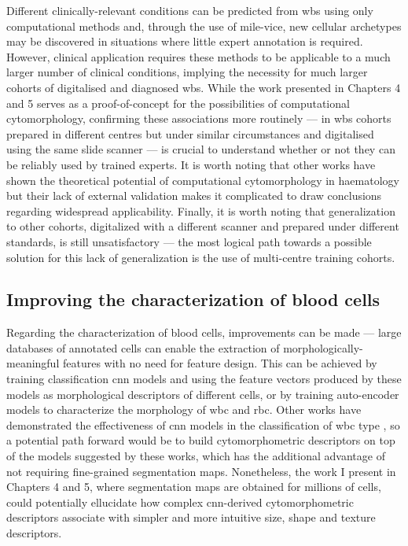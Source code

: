 Different clinically-relevant conditions can be predicted from \ac{wbs} using only computational methods and, through the use of \ac{mile-vice}, new cellular archetypes may be discovered in situations where little expert annotation is required. However, clinical application requires these methods to be applicable to a much larger number of clinical conditions, implying the necessity for much larger cohorts of digitalised and diagnosed \ac{wbs}. While the work presented in Chapters 4 and 5 serves as a proof-of-concept for the possibilities of computational cytomorphology, confirming these associations more routinely --- in \ac{wbs} cohorts prepared in different centres but under similar circumstances and digitalised using the same slide scanner --- is crucial to understand whether or not they can be reliably used by trained experts. It is worth noting that other works have shown the theoretical potential of computational cytomorphology in haematology \cite{Eckardt2021-fb,Bruck2021-fx} but their lack of external validation makes it complicated to draw conclusions regarding widespread applicability. Finally, it is worth noting that generalization to other cohorts, digitalized with a different scanner and prepared under different standards, is still unsatisfactory --- the most logical path towards a possible solution for this lack of generalization is the use of multi-centre training cohorts. 

\subsection{Improving the characterization of blood cells}

Regarding the characterization of blood cells, improvements can be made --- large databases of annotated cells can enable the extraction of morphologically-meaningful features with no need for feature design. This can be achieved by training classification \ac{cnn} models and using the feature vectors produced by these models as morphological descriptors of different cells, or by training auto-encoder models to characterize the morphology of \ac{wbc} and \ac{rbc}. Other works have demonstrated the effectiveness of \ac{cnn} models in the classification of \ac{wbc} type \cite{Matek2019-ld,Matek2021-mp,Kouzehkanan2021-mz}, so a potential path forward would be to build cytomorphometric descriptors on top of the models suggested by these works, which has the additional advantage of not requiring fine-grained segmentation maps. Nonetheless, the work I present in Chapters 4 and 5, where segmentation maps are obtained for millions of cells, could potentially ellucidate how complex \ac{cnn}-derived cytomorphometric descriptors associate with simpler and more intuitive size, shape and texture descriptors.

